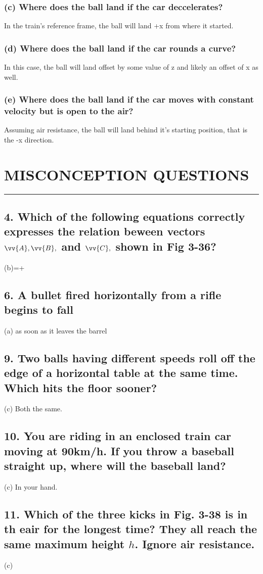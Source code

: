 \documentclass[12pt,a4paper,english]{article}
\begin{document}
\begin{flushleft}
  \subsubsection{(c) Where does the ball land if the car deccelerates?}
  In the train's reference frame, the ball will land +x from where it started.
  \subsubsection{(d) Where does the ball land if the car rounds a curve?}
  In this case, the ball will land offset by some value of z and likely an offset of x as well.
  \subsubsection{(e) Where does the ball land if the car moves with constant velocity but is open to the air?}
  Assuming air resistance, the ball will land behind it's starting position, that is the -x direction.
  \section*{MISCONCEPTION QUESTIONS}
  \hrule
  \subsection{4. Which of the following equations correctly expresses the relation beween vectors $\vv{A}, \vv{B},$ and $\vv{C},$ shown in Fig 3-36?}
  (b)=+
  \subsection{6. A bullet fired horizontally from a rifle begins to fall}
  (a) as soon as it leaves the barrel
  \subsection{9. Two balls having different speeds roll off the edge of a horizontal table at the same time. Which hits the floor sooner?}
  (c) Both the same.
  \subsection{10. You are riding in an enclosed train car moving at 90km/h. If you throw a baseball straight up, where will the baseball land?}
  (c) In your hand.
  \subsection{11. Which of the three kicks in Fig. 3-38 is in th eair for the longest time? They all reach the same maximum height $h$. Ignore air resistance.}
  (c)

\end{flushleft}
\end{document}
